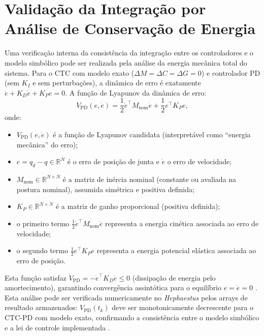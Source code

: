 \section{Validação da Integração por Análise de Conservação de Energia}
\label{sec:validacao_energia}

Uma verificação interna da consistência da integração entre os controladores e o modelo simbólico pode ser realizada pela análise da energia mecânica total do sistema. Para o CTC com modelo exato ($\Delta M = \Delta C = \Delta G = 0$) e controlador PD (sem $K_I$ e sem perturbações), a dinâmica de erro é exatamente $\ddot{e} + K_D\dot{e} + K_P e = 0$. A função de Lyapunov da dinâmica de erro:
\begin{equation}
    V_{\text{PD}}(e, \dot{e}) = \frac{1}{2}\dot{e}^\top M_{\text{nom}}\dot{e} + \frac{1}{2}e^\top K_P e,
    \label{eq:lyap_pd_energy}
\end{equation}
onde:
\begin{itemize}
    \item $V_{\text{PD}}(e, \dot{e})$ é a função de Lyapunov candidata (interpretável como ``energia mecânica'' do erro);
    \item $e = q_d - q \in \mathbb{R}^N$ é o erro de posição de junta e $\dot{e}$ o erro de velocidade;
    \item $M_{\text{nom}} \in \mathbb{R}^{N \times N}$ é a matriz de inércia nominal (constante ou avaliada na postura nominal), assumida simétrica e positiva definida;
    \item $K_P \in \mathbb{R}^{N \times N}$ é a matriz de ganho proporcional (positiva definida);
    \item o primeiro termo $\frac{1}{2}\dot{e}^\top M_{\text{nom}}\dot{e}$ representa a energia cinética associada ao erro de velocidade;
    \item o segundo termo $\frac{1}{2}e^\top K_P e$ representa a energia potencial elástica associada ao erro de posição.
\end{itemize}
Esta função satisfaz $\dot{V}_{\text{PD}} = -\dot{e}^\top K_D \dot{e} \leq 0$ (dissipação de energia pelo amortecimento), garantindo convergência assintótica para o equilíbrio $e = \dot{e} = 0$ \cite{khalil2002nonlinear}. Esta análise pode ser verificada numericamente no \textit{Hephaestus} pelos arrays de resultado armazenados: $V_{\text{PD}}(t_k)$ deve ser monotonicamente decrescente para o CTC-PD com modelo exato, confirmando a consistência entre o modelo simbólico e a lei de controle implementada \cite{corke2021toolbox}.

